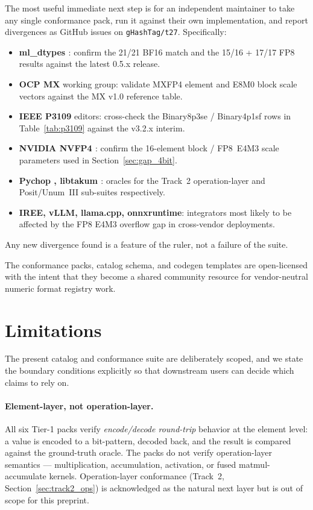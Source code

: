 \documentclass[11pt,letterpaper]{article}
\begin{document}
The most useful immediate next step is for an independent maintainer to take
any single conformance pack, run it against their own implementation, and
report divergences as GitHub issues on \texttt{gHashTag/t27}.  Specifically:
\begin{itemize}
  \item \textbf{ml\_dtypes \cite{mldtypes}}: confirm the 21/21 BF16 match and
    the 15/16 + 17/17 FP8 results against the latest 0.5.x release.
  \item \textbf{OCP MX} working group: validate MXFP4 element and E8M0 block
    scale vectors against the MX v1.0 reference table.
  \item \textbf{IEEE P3109} editors: cross-check the Binary8p3se /
    Binary4p1sf rows in Table~\ref{tab:p3109} against the v3.2.x interim.
  \item \textbf{NVIDIA NVFP4 \cite{nvfp4}}: confirm the 16-element block /
    FP8~E4M3 scale parameters used in Section~\ref{sec:gap_4bit}.
  \item \textbf{Pychop \cite{pychop}, libtakum \cite{libtakum}}: oracles for
    the Track~2 operation-layer and Posit/Unum~III sub-suites respectively.
  \item \textbf{IREE, vLLM, llama.cpp, onnxruntime}: integrators most likely
    to be affected by the FP8 E4M3 overflow gap in cross-vendor deployments.
\end{itemize}
Any new divergence found is a feature of the ruler, not a failure of the suite.

The conformance packs, catalog schema, and codegen templates are open-licensed
with the intent that they become a shared community resource for vendor-neutral
numeric format registry work.

\section{Limitations}
\label{sec:limitations}

The present catalog and conformance suite are deliberately scoped, and we
state the boundary conditions explicitly so that downstream users can decide
which claims to rely on.

\paragraph{Element-layer, not operation-layer.}
All six Tier-1 packs verify \emph{encode/decode round-trip} behavior at the
element level: a value is encoded to a bit-pattern, decoded back, and the
result is compared against the ground-truth oracle.  The packs do not verify
operation-layer semantics --- multiplication, accumulation, activation, or
fused matmul-accumulate kernels.  Operation-layer conformance (Track~2,
Section~\ref{sec:track2_ops}) is acknowledged as the natural next layer but
is out of scope for this preprint.
\end{document}
